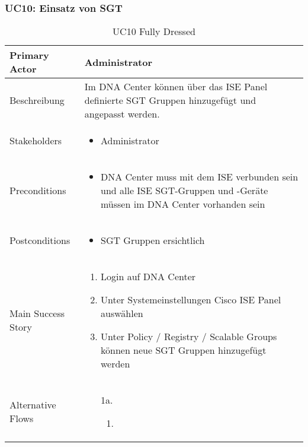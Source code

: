 \subsubsection{UC10: Einsatz von SGT}
\begin{table}[H]
	\centering
	\begin{tabularx}{\textwidth}{l | X}
		Primary Actor   & Administrator       \\
		\hline
		Beschreibung   & Im DNA Center können über das ISE Panel definierte SGT Gruppen hinzugefügt und angepasst werden.  \\ 
		\hline
		Stakeholders       & 
		\begin{itemize}
			\item Administrator
		\end{itemize} \\ 
		Preconditions      & 
		\begin{itemize}	
			\item DNA Center muss mit dem ISE verbunden sein und alle ISE SGT-Gruppen und -Geräte müssen im DNA Center vorhanden sein
		\end{itemize}  \\
		\hline
		Postconditions     & 
		\begin{itemize}	
			\item SGT Gruppen ersichtlich
		\end{itemize}  \\
		\hline
		Main Success Story & 
		\begin{enumerate}
			\item Login auf DNA Center
			\item Unter Systemeinstellungen Cisco ISE Panel auswählen
			\item Unter Policy / Registry / Scalable Groups können neue SGT Gruppen hinzugefügt werden
		\end{enumerate}
		\\
		\hline
		Alternative Flows  & 
		\begin{itemize}
			\item[1a.]  
			\begin{enumerate}
				\item 
			\end{enumerate}
		\end{itemize}
	\end{tabularx}
	\caption{UC10 Fully Dressed}
	\label{tab:UC10}
\end{table}

